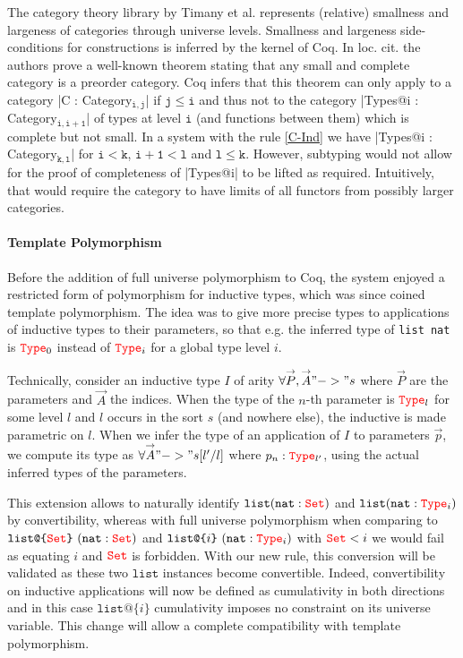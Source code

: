 \documentclass{easychair}
\newcommand{\Type}[1]{{\color{red} \mathtt{Type}}_{#1}}
\newcommand{\Set}{{\color{red} \mathtt{Set}}}
\begin{document}
The category theory library by Timany et
al. \cite{DBLP:conf/rta/Timany016} represents (relative) smallness and
largeness of categories through universe levels. Smallness and largeness
side-conditions for constructions is inferred by the kernel of Coq. In
loc. cit. the authors prove a well-known theorem stating that any small
and complete category is a preorder category. Coq infers that this
theorem can only apply to a category \Coqe|C : Category$_{\mathtt{i,j}}$|
if $\mathtt{j \le i}$ and thus not to
the category \Coqe|Types@{i} : Category$_{\mathtt{i, i + 1}}$| of types
at level $\mathtt{i}$ (and functions between them) which is complete but
not small.  In a system with the rule \ref{C-Ind} we have
\Coqe|Types@{i} : Category$_{\mathtt{k, l}}$| for $\mathtt{i < k}$,
$\mathtt{i + 1 < l}$ and $\mathtt{l \le k}$. However, subtyping would
not allow for the proof of completeness of \Coqe|Types@{i}| to be lifted
as required. Intuitively, that would require the category to have limits
of all functors from possibly larger categories.

\def\vec#1{\overset{\rightarrow}{#1}}
\def\clist{\texttt{list}}
\def\nat{\texttt{nat}}
\def\ulist#1{\texttt{list@\{}#1\texttt{\}}}
\paragraph{Template Polymorphism}

Before the addition of full universe polymorphism to Coq, the system
enjoyed a restricted form of polymorphism for inductive types, which was
since coined template polymorphism. The idea was to give more precise
types to applications of inductive types to their parameters, so that
e.g. the inferred type of \texttt{list nat} is $\Type{0}$ instead of
$\Type{i}$ for a global type level $i$.

Technically, consider an inductive type $I$ of arity
$\forall \vec{P}, \vec{A} "->" s$ where $\vec{P}$ are the parameters and
$\vec{A}$ the indices.  When the type of the $n$-th parameter is
$\Type{l}$ for some level $l$ and $l$ occurs in the sort $s$ (and
nowhere else), the inductive is made parametric on $l$. When we infer
the type of an application of $I$ to parameters $\vec{p}$, we compute
its type as $\forall \vec{A} "->" s[l'/l]$ where $p_n : \Type{l'}$,
using the actual inferred types of the parameters.

This extension allows to naturally identify $\clist (\nat : \Set)$ and
$\clist (\nat : \Type{i})$ by convertibility, whereas with full universe
polymorphism when comparing to $\ulist{\Set}~(\nat : \Set)$ and
$\ulist{i}~ (\nat : \Type{i})$ with $\Set < i$ we would fail as equating
$i$ and $\Set$ is forbidden. With our new rule, this conversion will be
validated as these two $\texttt{list}$ instances become convertible.
Indeed, convertibility on inductive applications will now be defined as
cumulativity in both directions and in this case $\ulist{i}$
cumulativity imposes no constraint on its universe variable. This change
will allow a complete compatibility with template polymorphism.
\end{document}
